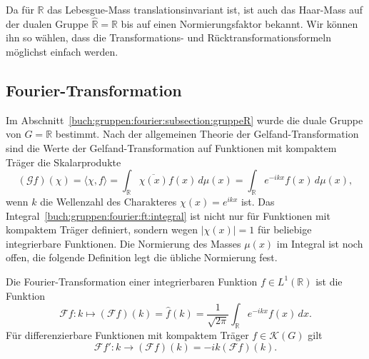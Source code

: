 Da für $\mathbb{R}$ das Lebesgue-Mass translationsinvariant ist,
ist auch das Haar-Mass auf der dualen Gruppe $\hat{\mathbb{R}}=\mathbb{R}$
bis auf einen Normierungsfaktor bekannt.
Wir können ihn so wählen, dass die Transformations- und
Rücktransformationsformeln möglichst einfach werden.

%
%
\subsection{Fourier-Transformation
\label{buch:gruppen:fourier:subsection:transformation}}
Im Abschnitt~\ref{buch:gruppen:fourier:subsection:gruppeR}
wurde die duale Gruppe von $G=\mathbb{R}$ bestimmt.
Nach der allgemeinen Theorie der Gelfand-Transformation sind die
Werte der Gelfand-Transformation auf Funktionen mit kompaktem
Träger die Skalarprodukte
\begin{equation}
(\mathscr{G}f)(\chi)
=
\langle \chi,f\rangle
=
\int_{\mathbb{R}} \overline{\chi(x)} f(x)\,d\mu(x)
=
\int_{\mathbb{R}} e^{-ikx} f(x)\,d\mu(x),
\label{buch:gruppen:fourier:ft:integral}
\end{equation}
wenn $k$ die Wellenzahl des Charakteres $\chi(x)=e^{ikx}$ ist.
Das Integral~\eqref{buch:gruppen:fourier:ft:integral} ist nicht nur
für Funktionen mit kompaktem Träger definiert, sondern wegen $|\chi(x)|=1$
für beliebige integrierbare Funktionen.
Die Normierung des Masses $\mu(x)$ im Integral ist noch offen, die
folgende Definition legt die übliche Normierung fest.

\begin{definition}
\label{buch:gruppen:fourier:def:ft}
Die Fourier-Transformation einer integrierbaren Funktion $f\in L^1(\mathbb{R})$
%
ist die Funktion
\[
\mathscr{F}f
\colon
k\mapsto
(\mathscr{F}f)(k)
=
\hat{f}(k)
=
\frac{1}{\!\sqrt{2\pi}}
\int_{\mathbb{R}} e^{-ikx}f(x)\,dx.
\]
Für differenzierbare Funktionen mit kompaktem Träger $f\in\mathscr{K}(G)$ 
gilt
\begin{equation}
\mathscr{F}f'
\colon k\to (\mathscr{F}f)(k)
=
-ik(\mathscr{F}f) (k).
\label{buch:gruppen:fourier:eqn:ableitung}
\end{equation}
\end{definition}

